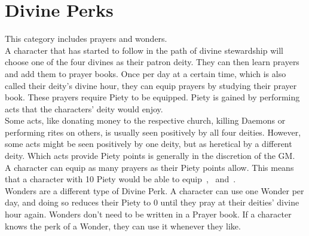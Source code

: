 \chapter{Divine Perks}\label{divinePerks}
This category includes prayers and wonders.\\
A character that has started to follow in the path of divine stewardship will choose one of the four divines as their patron deity.
They can then learn prayers and add them to prayer books.
Once per day at a certain time, which is also called their deity's divine hour, they can equip prayers by studying their prayer book.
These prayers require Piety to be equipped.
Piety is gained by performing acts that the characters' deity would enjoy.\\
Some acts, like donating money to the respective church, killing Daemons or performing rites on others, is usually seen positively by all four deities.
However, some acts might be seen positively by one deity, but as heretical by a different deity.
Which acts provide Piety points is generally in the discretion of the GM.\\
A character can equip as many prayers as their Piety points allow.
This means that a character with 10 Piety would be able to equip~,~ and~.\\
Wonders are a different type of Divine Perk.
A character can use one Wonder per day, and doing so reduces their Piety to 0 until they pray at their deities' divine hour again.
Wonders don't need to be written in a Prayer book.
If a character knows the perk of a Wonder, they can use it whenever they like.\\


	
	
	
	
	
	
	
	
	
	
	
	
	
	
	
	
	
	
	
	
	
	
	
